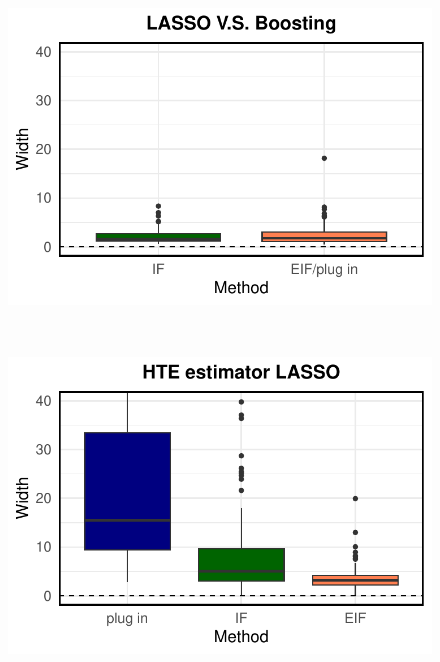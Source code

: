 \begin{figure}[ht]
\begin{minipage}{0.3\textwidth}
                \includegraphics[clip, trim = 0cm 0cm 0cm 0cm, width = \textwidth]{plot/ACIC_nonlinear_propensity_linear_HTE_CI_width_LASSO_V.S._Boosting.pdf}
        \end{minipage}        
            \\  
        \begin{minipage}{0.3\textwidth}
                \centering
                \includegraphics[clip, trim = 0cm 0cm 0cm 0cm, width = \textwidth]{plot/ACIC_nonlinear_propensity_nonlinear_HTE_CI_width_LASSO.pdf}
        \end{minipage}
        \begin{minipage}{0.3\textwidth}
                \centering

\end{minipage}
\end{figure}

